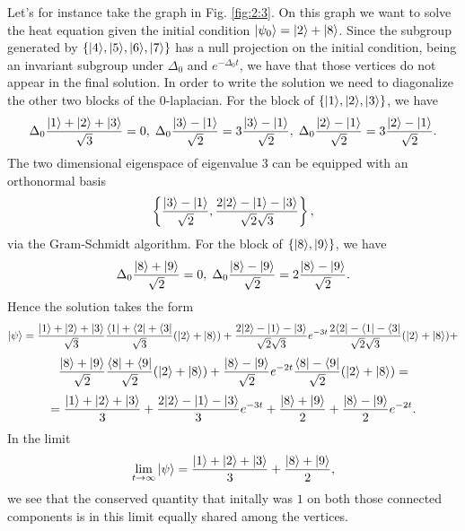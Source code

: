 \documentclass[../2.tex]{subfiles}
\begin{document}
    \begin{exa}
        Let's for instance take the graph in Fig. \ref{fig:2:3}. On this graph we want to solve the heat equation given the initial condition
        $| \psi_0 \rangle = | 2 \rangle+| 8 \rangle$. Since the subgroup generated by $\{| 4 \rangle,| 5 \rangle,| 6 \rangle,| 7 \rangle\}$ has a null projection on the initial condition, being an 
        invariant subgroup under $\Delta_0$ and $e^{-\Delta_0 t}$, we have that those vertices do not appear in the final solution.
        In order to write the solution we need to diagonalize the other two blocks of the $0$-laplacian.
        For the block of $\{| 1 \rangle,| 2 \rangle,| 3 \rangle\}$, we have 
        \[ \Delta_0 \frac{| 1 \rangle+| 2 \rangle+| 3 \rangle}{\sqrt{3}} = 0 , \;
        \Delta_0 \frac{| 3 \rangle-| 1 \rangle}{\sqrt{2}} = 3 \frac{| 3 \rangle-| 1 \rangle}{\sqrt{2}}, \;
        \Delta_0 \frac{| 2 \rangle-| 1 \rangle}{\sqrt{2}} = 3 \frac{| 2 \rangle-| 1 \rangle}{\sqrt{2}}. \]
        The two dimensional eigenspace of eigenvalue $3$ can be equipped with an orthonormal basis 
        \[ \left\{ \frac{| 3 \rangle-| 1 \rangle}{\sqrt{2}}, \frac{2| 2 \rangle-| 1 \rangle-| 3 \rangle}{\sqrt{2}\sqrt{3}} \right\}, \]
        via the Gram-Schmidt algorithm.
        For the block of $\{| 8 \rangle,| 9 \rangle\}$, we have 
        \[ \Delta_0 \frac{| 8 \rangle+| 9 \rangle}{\sqrt{2}} = 0, \;
        \Delta_0 \frac{| 8 \rangle-| 9 \rangle}{\sqrt{2}} = 2 \frac{| 8 \rangle-| 9 \rangle}{\sqrt{2}}. \]
        Hence the solution takes the form
        \[ | \psi \rangle = \frac{| 1 \rangle+| 2 \rangle+| 3 \rangle}{\sqrt{3}}\frac{\langle 1 |+\langle 2 |+\langle 3 |}{\sqrt{3}}(| 2 \rangle+| 8 \rangle) + 
        \frac{2| 2 \rangle-| 1 \rangle-| 3 \rangle}{\sqrt{2}\sqrt{3}} e^{-3t}  \frac{2\langle 2 |-\langle 1 |-\langle 3 |}{\sqrt{2}\sqrt{3}}(| 2 \rangle+| 8 \rangle) + \]
        \[ \frac{| 8 \rangle+| 9 \rangle}{\sqrt{2}}\frac{\langle 8 |+\langle 9 |}{\sqrt{2}}(| 2 \rangle+| 8 \rangle) +
        \frac{| 8 \rangle-| 9 \rangle}{\sqrt{2}}e^{-2t}\frac{\langle 8 |-\langle 9 |}{\sqrt{2}}(| 2 \rangle+| 8 \rangle) =\]
        \[ = \frac{| 1 \rangle+| 2 \rangle+| 3 \rangle}{3}+ \frac{2| 2 \rangle-| 1 \rangle-| 3 \rangle}{3} e^{-3t} + \frac{| 8 \rangle+| 9 \rangle}{2} + \frac{| 8 \rangle-| 9 \rangle}{2}e^{-2t}. \]
        In the limit 
        \[ \lim_{t \to \infty} | \psi \rangle = \frac{| 1 \rangle+| 2 \rangle+| 3 \rangle}{3}+\frac{| 8 \rangle+| 9 \rangle}{2}, \]
        we see that the conserved quantity that initally was $1$ on both those connected components is in this 
        limit equally shared among the vertices.
    \end{exa}
    
\end{document}
